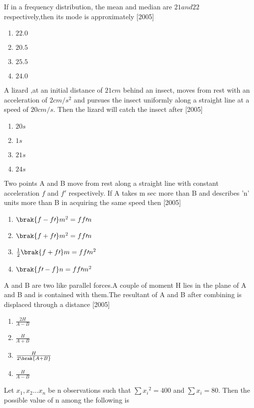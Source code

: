 \item If in a frequency distribution, the mean and median are $21 and 22$ respectively,then its mode is approximately
\hfill{[2005]}
\begin{enumerate}
\item $22.0$
\item $20.5$
\item $25.5$
\item $24.0$
\end{enumerate}
\item A lizard ,at an initial distance of $21 cm$ behind an insect, moves from rest with an acceleration of $2cm/{s}^2$ and pursues the insect uniformly along a straight line at a speed of $20cm/s$. Then the lizard will catch the insect after
\hfill{[2005]}
\begin{enumerate}
\item $20s$
\item $1s$
\item $21s$
\item $24s$
\end{enumerate}
\item Two points A and B move from rest along a straight line with constant acceleration $f$ and $f'$ respectively. If A takes m sec more than B and describes 'n' units more than B in acquiring the same speed then 
\hfill{[2005]}
\begin{enumerate}
\item $\brak{f-f\prime}m^2 =ff\prime n$
\item $\brak{f+f\prime}m^2 =ff\prime n$
\item $\frac{1}{2}\brak{f+f\prime}m =ff\prime n^2$
\item $\brak{f\prime-f}n =ff\prime m^2$
\end{enumerate}
\item A and B are two like parallel forces.A couple of moment H lies in the plane of A and B and is contained with them.The resultant of A and B after combining is displaced through a distance
\hfill{[2005]}
\begin{enumerate}
\item $\frac{2H}{A-B}$
\item $\frac{H}{A+B}$
\item $\frac{H}{2\brak{A+B}}$
\item $\frac{H}{A-B}$
\end{enumerate}
\item Let $x_1,x_2 \dots x_n$ be n observations such that $\sum {x_i}^2 = 400$ and $\sum {x_i} = 80$. Then the possible value of n among the following is
